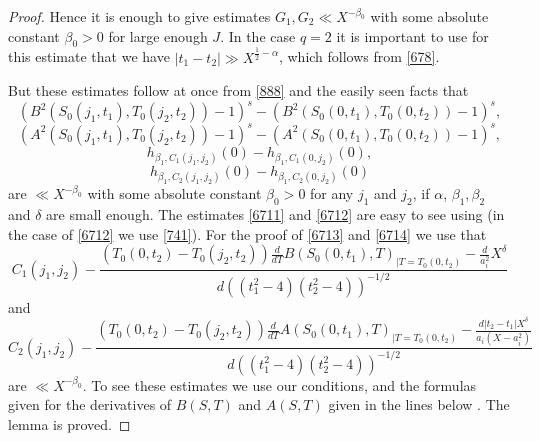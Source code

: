\documentclass[12pt]{amsart}
\theoremstyle{definition}
\numberwithin{equation}{section}
\begin{document}
\begin{proof}
Hence it is enough to give estimates $G_1,G_2\ll X^{-\beta_0}$ with
some absolute constant $\beta_0>0$ for large enough $J$. In the case $
q=2$ it is important to use for this estimate that we
have $\left|t_1-t_2\right|\gg X^{\frac 12-\alpha}$, which follows from \eqref{678}.

But these estimates follow at once from \eqref{888} and the easily seen facts that
\begin{equation}\left(B^2\left(S_0\left(j_1,t_1\right),T_0\left(j_
2,t_2\right)\right)-1\right)^s-\left(B^2\left(S_0\left(0,t_1\right
),T_0\left(0,t_2\right)\right)-1\right)^s,\label{6711}\end{equation}
\begin{equation}\left(A^2\left(S_0\left(j_1,t_1\right),T_0\left(j_
2,t_2\right)\right)-1\right)^s-\left(A^2\left(S_0\left(0,t_1\right
),T_0\left(0,t_2\right)\right)-1\right)^s,\label{6712}\end{equation}
\begin{equation}h_{\beta_1,C_1\left(j_1,j_2\right)}\left(0\right)
-h_{\beta_1,C_1\left(0,j_2\right)}\left(0\right),\label{6713}\end{equation}
\begin{equation}h_{\beta_1,C_2\left(j_1,j_2\right)}\left(0\right)
-h_{\beta_1,C_2\left(0,j_2\right)}\left(0\right)\label{6714}\end{equation}
are $\ll X^{-\beta_0}$ with some absolute constant $\beta_0>0$ for any $
j_1$
and $j_2$, if $\alpha$, $\beta_1,\beta_2$ and $\delta$ are small enough. The
estimates \eqref{6711} and \eqref{6712} are easy to see
using \cite[(6.28), (6.29)]{Biro} (in the case of \eqref{6712} we use \eqref{741}). For the proof
of \eqref{6713} and \eqref{6714} we use that
\[C_1\left(j_1,j_2\right)_{}-\frac {\left(T_0\left(0,t_2\right)-T_
0\left(j_2,t_2\right)\right)\frac d{dT}B\left(S_0\left(0,t_1\right
),T\right)_{|T=T_0\left(0,t_2\right)}-\frac d{a_i^2}X^{\delta}}{d\left
(\left(t_1^2-4\right)\left(t_2^2-4\right)\right)^{-1/2}}\]
and
\[C_2\left(j_1,j_2\right)_{}-\frac {\left(T_0\left(0,t_2\right)-T_
0\left(j_2,t_2\right)\right)\frac d{dT}A\left(S_0\left(0,t_1\right
),T\right)_{|T=T_0\left(0,t_2\right)}-\frac {d\left|t_2-t_1\right
|X^{\delta}}{a_i\left(X-a_i^2\right)}}{d\left(\left(t_1^2-4\right
)\left(t_2^2-4\right)\right)^{-1/2}}\]
are $\ll X^{-\beta_0}$. To see these estimates we use our
conditions, \cite[(6.26)]{Biro} and the formulas given for the derivatives of
$B\left(S,T\right)$ and $A\left(S,T\right)$ given in the lines below \cite[(6.27)]{Biro}. The lemma is proved.
\end{proof}
\end{document}
